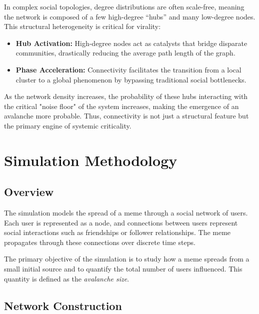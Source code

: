 \documentclass[12pt]{article}
\begin{document}
\vspace{0.6cm}

In complex social topologies, degree distributions are often scale-free, meaning the network is composed of a few high-degree ``hubs'' and many low-degree nodes. This structural heterogeneity is critical for virality:

\begin{itemize}
    \item \textbf{Hub Activation:} High-degree nodes act as catalysts that bridge disparate communities, drastically reducing the average path length of the graph.
    \item \textbf{Phase Acceleration:} Connectivity facilitates the transition from a local cluster to a global phenomenon by bypassing traditional social bottlenecks.
\end{itemize}

\vspace{0.8cm}

As the network density increases, the probability of these hubs interacting with the critical "noise floor" of the system increases, making the emergence of an avalanche more probable. Thus, connectivity is not just a structural feature but the primary engine of systemic criticality.

\vfill

\newpage

\section{\large Simulation Methodology}

\subsection{Overview}

The simulation models the spread of a meme through a social network of users. Each user is represented as a node, and connections between users represent social interactions such as friendships or follower relationships. The meme propagates through these connections over discrete time steps.

The primary objective of the simulation is to study how a meme spreads from a small initial source and to quantify the total number of users influenced. This quantity is defined as the \textit{avalanche size}.

\subsection{Network Construction}
\end{document}
